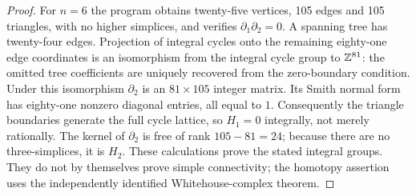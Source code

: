 \begin{proof}
For $n=6$ the program obtains twenty-five vertices, 105 edges and 105 triangles, with no higher simplices, and verifies $\partial_1\partial_2=0$. A spanning tree has twenty-four edges. Projection of integral cycles onto the remaining eighty-one edge coordinates is an isomorphism from the integral cycle group to $\mathbb Z^{81}$: the omitted tree coefficients are uniquely recovered from the zero-boundary condition. Under this isomorphism $\partial_2$ is an $81\times105$ integer matrix. Its Smith normal form has eighty-one nonzero diagonal entries, all equal to $1$. Consequently the triangle boundaries generate the full cycle lattice, so $H_1=0$ integrally, not merely rationally. The kernel of $\partial_2$ is free of rank $105-81=24$; because there are no three-simplices, it is $H_2$. These calculations prove the stated integral groups. They do not by themselves prove simple connectivity; the homotopy assertion uses the independently identified Whitehouse-complex theorem.
\end{proof}

